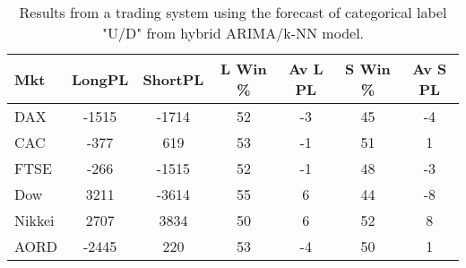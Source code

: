 \begin{table}[ht]
\centering
\caption[Results from a trading system using the forecast of categorical label "U/D" from hybrid ARIMA/k-NN model]{Results from a trading system using the forecast of categorical label "U/D" from hybrid ARIMA/k-NN model.} 
\label{tab:chp_ts:pUD_CAT_arima_knn_sys}
\begin{tabular}{lcccccc}
  \toprule Mkt & LongPL & ShortPL & L Win \% & Av L PL & S Win \% & Av S PL \\ 
  \midrule DAX & -1515 & -1714 & 52 & -3 & 45 & -4 \\ 
  CAC & -377 & 619 & 53 & -1 & 51 & 1 \\ 
  FTSE & -266 & -1515 & 52 & -1 & 48 & -3 \\ 
  Dow & 3211 & -3614 & 55 & 6 & 44 & -8 \\ 
  Nikkei & 2707 & 3834 & 50 & 6 & 52 & 8 \\ 
  AORD & -2445 & 220 & 53 & -4 & 50 & 1 \\ 
   \bottomrule \end{tabular}
\end{table}
